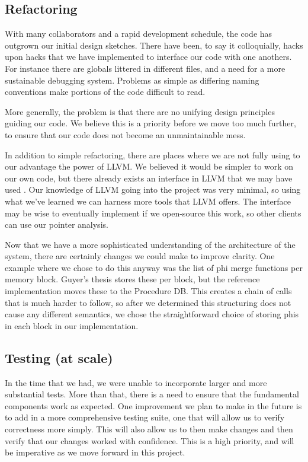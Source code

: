 \subsection{Refactoring}

With many collaborators and a rapid development schedule, the code has outgrown
our initial design sketches. There have been, to say it colloquially, hacks upon
hacks that we have implemented to interface our code with one anothers. For
instance there are globals littered in different files, and a need for a more
sustainable debugging system. Problems as simple as differing naming conventions
make portions of the code difficult to read.

More generally, the problem is that there are no unifying design principles
guiding our code. We believe this is a priority before we move too much further,
to ensure that our code does not become an unmaintainable mess.

In addition to simple refactoring, there are places where we are not fully using
to our advantage the power of LLVM. We believed it would be simpler to work on
our own code, but there already exists an  interface in LLVM
that we may have used \cite{aliasanalysis} . Our knowledge of LLVM going into
the project was very minimal, so using what we've learned we can harness more
tools that LLVM offers. The  interface may be wise to
eventually implement if we open-source this work, so other clients can use our
pointer analysis.

Now that we have a more sophisticated understanding of the architecture of the
system, there are certainly changes we could make to improve clarity. One
example where we chose to do this anyway was the list of phi merge functions per
memory block. Guyer's thesis stores these per block, but the reference implementation
moves these to the Procedure DB.  This creates a chain of calls that is much
harder to follow, so after we determined this structuring does not cause any
different semantics, we chose the straightforward choice of storing phis in each
block in our implementation.

\subsection{Testing (at scale)}

In the time that we had, we were unable to incorporate larger and more
substantial tests. More than that, there is a need to ensure that the
fundamental components work as expected. One improvement we plan to make in the
future is to add in a more comprehensive testing suite, one that will allow us
to verify correctness more simply. This will also allow us to then make changes
and then verify that our changes worked with confidence. This is a high
priority, and will be imperative as we move forward in this project. 

